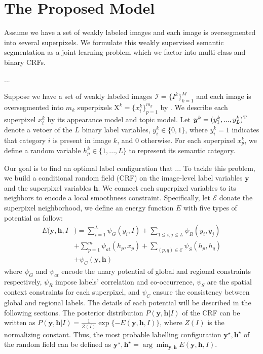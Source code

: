 
\section{The Proposed Model}
Assume we have a set of weakly labeled images and each image is oversegmented into several superpixels.
We formulate this weakly supervised semantic segmentation as a joint learning problem which we factor into multi-class and binary CRFs.

...

Suppose we have a set of weakly labeled images $\mathcal{I}=\{I^k\}_{k=1}^M$ and each image is oversegmented into $m_k$ superpixels $\mathrm{X}^k=\{x_i^k\}_{p=1}^{m_k}$ by \cite{arbelaez2014multiscale}.  We describe each superpixel $x_i^k$ by its appearance model and topic model. Let $\boldsymbol{y}^k = (y_1^k,...,y_L^k)^{\rm T}$ denote a vetoer of the $L$ binary label variables, \ie $y_i^k \in \{0,1\}$, where $y_i^k=1$ indicates that category $i$ is present in image $k$, and $0$ otherwise. For each superpixel $x_p^k$, we define a random variable $h_p^k \in \{1,...,L\}$ to represent its semantic category.


Our goal is to find an optimal label configuration that ... To tackle this problem, we build a conditional random field (CRF) on the image-level label variables $\boldsymbol{y}$ and the superpixel variables $\boldsymbol{h}$. We connect each superpixel variables to its neighbors to encode a local smoothness constraint. Specifically, let $\mathcal{E}$ donate the superpixel neighborhood, we define an energy function $E$ with five types of potential as follow:
\begin{equation}
    \label{eq:energyfunction}
    \begin{aligned}
        E(\boldsymbol{y},\boldsymbol{h},I&) = \sum_{i=1}^L{\psi_{G}(y_i,I)}
                            + \sum_{1 \le i,j \le L} {\psi_{R}(y_i,y_j)}\\ &+ \sum_{p=1}^{m}{\psi_{at}(h_p,x_p)}+ \sum_{(p,q) \in \mathcal{E}}{\psi_{S}(h_p,h_q)}\\ &+ \psi_{C}(\boldsymbol{y},\boldsymbol{h})
    \end{aligned}
\end{equation}
where $\psi_G$ and $\psi_{at}$ encode the unary potential of global and regional constraints respectively, $\psi_R$ impose labels' correlation and co-occurrence, $\psi_S$ are the spatial context constraints for each superpixel, and $\psi_C$ ensure the consistency between global and regional labels. The details of each potential will be described in the following sections. The posterior distribution $P(\boldsymbol{y},\boldsymbol{h}|I)$ of the CRF can be written as $P(\boldsymbol{y},\boldsymbol{h}|I) = \frac{1}{Z(I)}\exp{\{-E(\boldsymbol{y},\boldsymbol{h},I)\}}$, where $Z(I)$ is the normalizing constant. Thus, the most probable labelling configuration $\boldsymbol{y}^{\star},\boldsymbol{h}^{\star}$ of the random field can be defined as  $\boldsymbol{y}^{\star},\boldsymbol{h}^{\star} = \arg \min_{\boldsymbol{y},\boldsymbol{h}} E(\boldsymbol{y},\boldsymbol{h},I)$.

